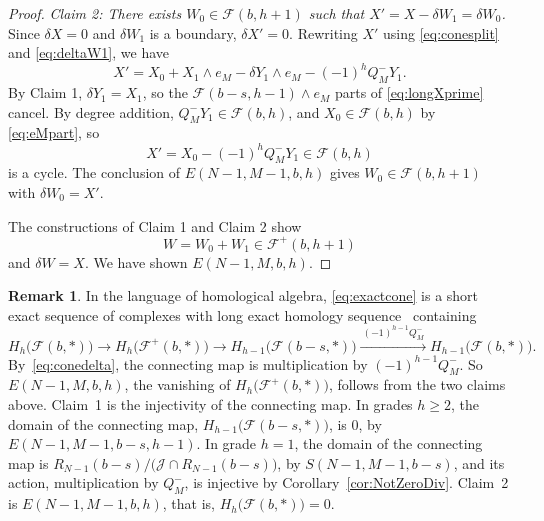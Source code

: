 \documentclass[12pt]{amsart}
\theoremstyle{definition}
\newtheorem{remark1}[theorem]{Remark}
\theoremstyle{remark}
\newcommand{\cJ}{\mathcal J}
\newcommand{\FF}{\mathcal F}
\begin{document}
\begin{proof}
\smallskip
\emph{Claim 2: There exists $W_0 \in \FF(b, h+1)$ such that
$X'= X - \delta W_1 = \delta W_0$.}
Since $\delta X = 0$ and $\delta W_1$ is a boundary, $\delta X' =0$.
Rewriting $X'$ using \eqref{eq:conesplit} and \eqref{eq:deltaW1},
we have
\begin{equation}\label{eq:longXprime}
X' = X_0 + X_1 \wedge e_M -  \delta Y_1 \wedge e_{M} - (-1)^{h}Q^-_M Y_1.
\end{equation}
By Claim 1, $\delta Y_1 = X_1$, so the $\FF({b-s},{h-1})\wedge e_M$ parts of \eqref{eq:longXprime}
cancel.  By degree addition, $Q^-_M Y_1 \in \FF(b, h)$, and
$X_0 \in \FF(b, h)$ by \eqref{eq:eMpart}, so
\begin{equation}\label{eq:shortXprime}
 X' = X_0 -  (-1)^{h}Q^-_M Y_1 \in \FF(b, h)
 \end{equation}
is a cycle. The conclusion of $E(N-1,M-1,b,h)$ gives
$W_0\in\FF(b,h+1)$ with $\delta W_0=X'$.

The constructions of Claim 1 and Claim 2 show
\begin{equation}\label{eq:Wtogether}
W=W_0+W_1\in \FF^+(b, h+1)
\end{equation}
and $\delta W=X$.  We have shown $E(N-1, M, b, h)$.
\end{proof}
\smallskip

\begin{remark1}\label{rem:coneLES}
In the language of homological algebra, \eqref{eq:exactcone}
is a short exact sequence of
complexes with long
exact homology sequence~\cite[\S1.3]{Weibel} containing
\[ %
H_h\bigl(\FF(b,*)\bigr) \to H_h\bigl(\FF^+(b,*)\bigr) \to
H_{h-1}\bigl(\FF(b-s,*)\bigr)
\xrightarrow{\ (-1)^{h-1}Q^-_M\ } H_{h-1}\bigl(\FF(b,*)\bigr).
\] %
By~\eqref{eq:conedelta}, the connecting map is multiplication by $(-1)^{h-1}Q^-_M$.
So $E(N-1,M,b,h)$, the vanishing of 
$H_h\bigl(\FF^+(b,*)\bigr)$, follows from the two claims above.
Claim~1 is the injectivity of the connecting map. In grades
$h\ge2$, the domain of the connecting map, $H_{h-1}\bigl(\FF(b-s, *)\bigr)$, is $0$, by $E(N-1,M-1,b-s,h-1)$.
In grade $h=1$, the domain of the connecting map is 
$R_{N-1}(b-s)/\bigl(\cJ\cap R_{N-1}(b-s)\bigr)$, by $S(N-1,M-1,b-s)$,
and its action, multiplication by $Q^-_M$, is injective by
Corollary~\ref{cor:NotZeroDiv}.  
Claim~2 is $E(N-1,M-1,b,h)$, that is, $H_h\bigl(\FF(b, *)\bigr) = 0$.
\end{remark1}
\end{document}

